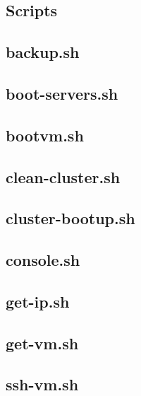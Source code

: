\subsection{Scripts}

\subsection{backup.sh}
\noindent


\subsection{boot-servers.sh}
\noindent


\subsection{bootvm.sh}
\noindent


\subsection{clean-cluster.sh}
\noindent


\subsection{cluster-bootup.sh}
\noindent


\subsection{console.sh}
\noindent


\subsection{get-ip.sh}
\noindent


\subsection{get-vm.sh}
\noindent


\subsection{ssh-vm.sh}
\noindent


